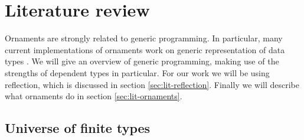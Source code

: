 \section{Literature review}\label{sec:lit}

Ornaments are strongly related to generic programming.
In particular, many current implementations of ornaments work on
generic representation of data types \cite{dagand12,dagand14-essence,dagand14-transporting}.
We will give an overview of generic programming, making use of the
strengths of dependent types in particular.
For our work we will be using reflection, which is discussed in
section \ref{sec:lit-reflection}.
Finally we will describe what ornaments do in section
\ref{sec:lit-ornaments}.



\subsection{Universe of finite types}

